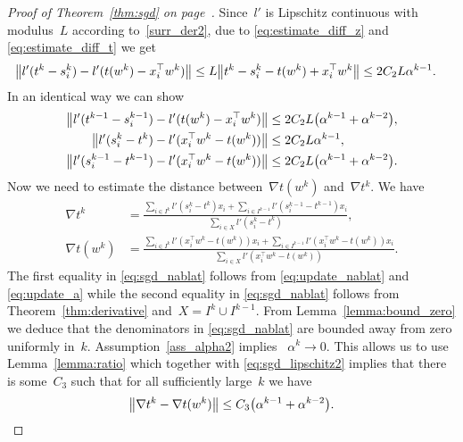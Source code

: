 \begin{proof}[Proof of Theorem~\ref{thm:sgd} on page~\pageref{thm:sgd}]
  Since~$l'$ is Lipschitz continuous with modulus~$L$ according to~\ref{surr_der2}, due to \eqref{eq:estimate_diff_z} and \eqref{eq:estimate_diff_t} we get
  \begin{equation}\label{eq:sgd_lipschitz1}
    \begin{aligned}
      \nrm{l'(t^k-s_i^k) - l'(t(w^k)-x_i^\top w^k)}
      & \le L \nrm{t^k-s_i^k - t(w^k)+ x_i^\top w^k}
        \le  2C_2L\alpha^{k-1}.
    \end{aligned}
  \end{equation}
  In an identical way we can show
  \begin{equation}\label{eq:sgd_lipschitz2}
    \begin{aligned}
      \nrm{l'(t^{k-1}-s_i^{k-1}) - l'(t(w^k)-x_i^\top w^k)}
      & \le 2C_2L\Brac{\alpha^{k-1}+\alpha^{k-2}}, \\
      \nrm{l'(s_i^k-t^k) - l'(x_i^\top w^k-t(w^k))}
      & \le 2C_2L\alpha^{k-1}, \\
      \nrm{l'(s_i^{k-1}-t^{k-1}) - l'(x_i^\top w^k-t(w^k))}
      & \le 2C_2L\Brac{\alpha^{k-1}+\alpha^{k-2}}.
    \end{aligned}
  \end{equation}
  Now we need to estimate the distance between~$\nabla t(w^k)$ and~$\nabla t^k$. We have
  \begin{equation}\label{eq:sgd_nablat}
    \begin{aligned}
      \nabla t^k
      & = \frac{\sum_{i\in I^k}l'(s_i^k-t^k)x_i + \sum_{i\in I^{k-1}}l'(s_i^{k-1}-t^{k-1})x_i}{\sum_{i\in X}l'(s_i^k-t^k)}, \\
      \nabla t(w^k)
      & = \frac{\sum_{i\in I^k}l'(x_i^\top w^k-t(w^k))x_i + \sum_{i\in I^{k-1}}l'(x_i^\top w^k-t(w^k))x_i}{\sum_{i\in X}l'(x_i^\top w^k-t(w^k))}.
    \end{aligned}
  \end{equation}
  The first equality in \eqref{eq:sgd_nablat} follows from \eqref{eq:update_nablat} and \eqref{eq:update_a} while the second equality in \eqref{eq:sgd_nablat} follows from Theorem~\ref{thm:derivative} and~$X=I^k\cup I^{k-1}$. From Lemma~\ref{lemma:bound_zero} we deduce that the denominators in \eqref{eq:sgd_nablat} are bounded away from zero uniformly in~$k$. Assumption~\ref{ass_alpha2} implies ~$\alpha^k\to 0$. This allows us to use Lemma~\ref{lemma:ratio} which together with \eqref{eq:sgd_lipschitz2} implies that there is some~$C_3$ such that for all sufficiently large~$k$ we have
  \begin{equation}\label{eq:sgd_nablat_diff}
    \norm{\nabla t^k - \nabla t(w^k)} \le C_3\Brac{\alpha^{k-1} + \alpha^{k-2}}.
  \end{equation}


\end{proof}
